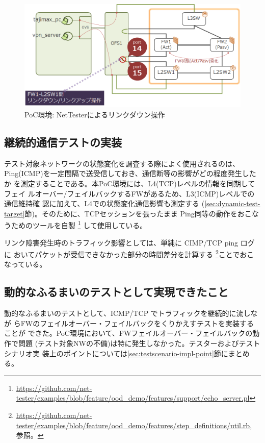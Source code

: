 \begin{figure}[h]
 \centering
 \includegraphics[scale=0.6]{img/poc-env-linkdown.png}
 \caption{PoC環境: NetTesterによるリンクダウン操作}
 \label{fig:poc-env-linkdown}
\end{figure}

  \subsection{継続的通信テストの実装}

テスト対象ネットワークの状態変化を調査する際によく使用されるのは、
Ping(ICMP)を一定間隔で送受信しておき、通信断等の影響がどの程度発生したか
を測定することである。本PoC環境には、L4(TCP)レベルの情報を同期してフェイ
ルオーバー/フェイルバックするFWがあるため、L3(ICMP)レベルでの通信維持確
認に加えて、L4での状態変化通信影響も測定する
(\ref{sec:dynamic-test-target}節)。そのために、TCPセッションを張ったまま
Ping同等の動作をおこなうためのツールを自製
\footnote{\url{https://github.com/net-tester/examples/blob/feature/ood_demo/features/support/echo_server.pl}}
して使用している。

リンク障害発生時のトラフィック影響としては、単純に CIMP/TCP ping ログに
おいてパケットが受信できなかった部分の時間差分を計算する
\footnote{\url{https://github.com/net-tester/examples/blob/feature/ood_demo/features/step_definitions/util.rb},
参照。}ことでおこなっている。

  \subsection{動的なふるまいのテストとして実現できたこと}
  \label{sec:dynamic-test-result}

動的なふるまいのテストとして、ICMP/TCP でトラフィックを継続的に流しなが
らFWのフェイルオーバー・フェイルバックをくりかえすテストを実装することが
できた。PoC環境において、FWフェイルオーバー・フェイルバックの動作で問題
(テスト対象NWの不備)は特に発生しなかった。テスターおよびテストシナリオ実
装上のポイントについては\ref{sec:testscenario-impl-point}節にまとめる。

